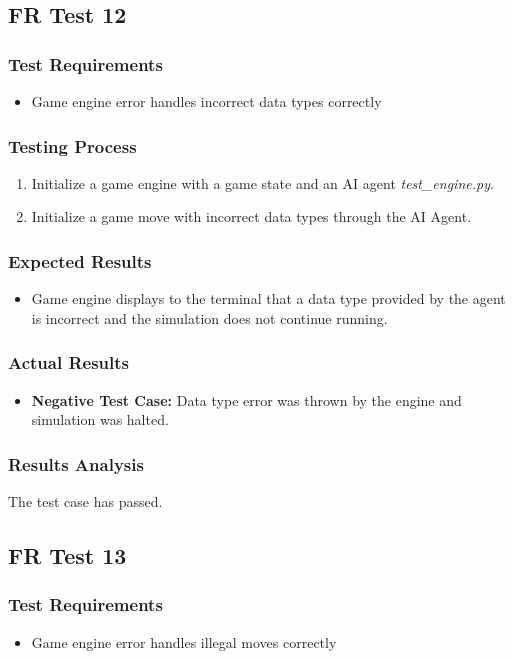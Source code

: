 \documentclass[12pt, titlepage]{article}
\providecommand{\DIFaddbegin}{} %
\providecommand{\DIFaddend}{} %
\begin{document}
\subsection{FR Test 12}\DIFaddbegin \label{FRT12} 
\DIFaddend \subsubsection{Test Requirements}
\begin{itemize}
    \item Game engine error handles incorrect data types correctly
\end{itemize}
\subsubsection{Testing Process}
\begin{enumerate}
    \item Initialize a game engine with a game state and an AI agent \textit{test\_engine.py}. 
    \item Initialize a game move with incorrect data types through the AI Agent.
\end{enumerate}
\subsubsection{Expected Results}
\begin{itemize}
    \item Game engine displays to the terminal that a data type provided by the agent is incorrect and the simulation does not continue running.
\end{itemize}
\subsubsection{Actual Results}
\begin{itemize}
    \item \textbf{Negative Test Case:} Data type error was thrown by the engine and simulation was halted.
\end{itemize}
\subsubsection{Results Analysis}
The test case has passed.

\subsection{FR Test 13}\DIFaddbegin \label{FRT13} 
\DIFaddend \subsubsection{Test Requirements}
\begin{itemize}
    \item Game engine error handles illegal moves correctly
\end{itemize}
\end{document}
